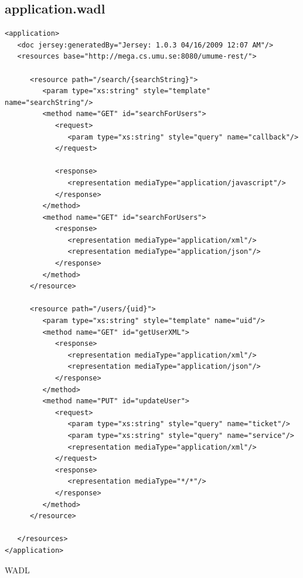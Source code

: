 \documentclass[titlepage, twocolumn, a4paper, 10pt]{article}
\begin{document}
\subsection{application.wadl}\label{app:wadl}
\begin{code}
  \begin{footnotesize}
\begin{verbatim}
<application>
   <doc jersey:generatedBy="Jersey: 1.0.3 04/16/2009 12:07 AM"/>
   <resources base="http://mega.cs.umu.se:8080/umume-rest/">

      <resource path="/search/{searchString}">
         <param type="xs:string" style="template" name="searchString"/>
         <method name="GET" id="searchForUsers">
            <request>
               <param type="xs:string" style="query" name="callback"/>
            </request>

            <response>
               <representation mediaType="application/javascript"/>
            </response>
         </method>
         <method name="GET" id="searchForUsers">
            <response>
               <representation mediaType="application/xml"/>
               <representation mediaType="application/json"/>
            </response>
         </method>
      </resource>

      <resource path="/users/{uid}">
         <param type="xs:string" style="template" name="uid"/>
         <method name="GET" id="getUserXML">
            <response>
               <representation mediaType="application/xml"/>
               <representation mediaType="application/json"/>
            </response>
         </method>
         <method name="PUT" id="updateUser">
            <request>
               <param type="xs:string" style="query" name="ticket"/>
               <param type="xs:string" style="query" name="service"/>
               <representation mediaType="application/xml"/>
            </request>
            <response>
               <representation mediaType="*/*"/>
            </response>
         </method>
      </resource>

   </resources>
</application>
\end{verbatim}
  \end{footnotesize}
  \caption{WADL}\label{code:wadl}
\end{code}
\newpage
\end{document}
